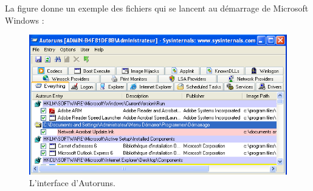 La figure donne un exemple des fichiers qui se lancent au démarrage de Microsoft Windows :
\begin{figure}[H]
\begin{center}
\includegraphics[scale=0.7]{Figures/anal13.png}
\caption{L'interface d'Autoruns.}
\label{fig :anal13} 
\end{center}
\end{figure}
